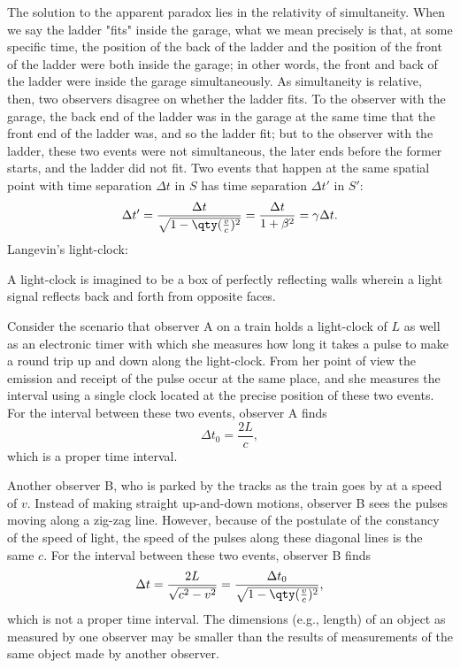 \documentclass[a4paper,12pt]{article}
\begin{document}
The solution to the apparent paradox lies in the relativity of simultaneity. When we say the ladder "fits" inside the garage, what we mean precisely is that, at some specific time, the position of the back of the ladder and the position of the front of the ladder were both inside the garage; in other words, the front and back of the ladder were inside the garage simultaneously. As simultaneity is relative, then, two observers disagree on whether the ladder fits. To the observer with the garage, the back end of the ladder was in the garage at the same time that the front end of the ladder was, and so the ladder fit; but to the observer with the ladder, these two events were not simultaneous, the later ends before the former starts, and the ladder did not fit.
Two events that happen at the same spatial point with time separation $\Delta t$ in $S$ has time separation $\Delta t'$ in $S'$:
\[\Delta t'=\frac{\Delta t}{\sqrt{1-\qty(\frac{v}{c})^2}}=\frac{\Delta t}{1+\beta^2}=\gamma\Delta t.\]
Langevin's light-clock: 

A light-clock is imagined to be a box of perfectly reflecting walls wherein a light signal reflects back and forth from opposite faces.

Consider the scenario that observer A on a train holds a light-clock of $L$ as well as an electronic timer with which she measures how long it takes a pulse to make a round trip up and down along the light-clock. From her point of view the emission and receipt of the pulse occur at the same place, and she measures the interval using a single clock located at the precise position of these two events. For the interval between these two events, observer A finds
\[\Delta t_0=\frac{2L}{c},\]
which is a proper time interval.

Another observer B, who is parked by the tracks as the train goes by at a speed of $v$⁠. Instead of making straight up-and-down motions, observer B sees the pulses moving along a zig-zag line. However, because of the postulate of the constancy of the speed of light, the speed of the pulses along these diagonal lines is the same $c$. For the interval between these two events, observer B finds
\[\Delta t=\frac{2L}{\sqrt{c^2-v^2}}=\frac{\Delta t_0}{\sqrt{1-\qty(\frac{v}{c})^2}},\]
which is not a proper time interval.
The dimensions (e.g., length) of an object as measured by one observer may be smaller than the results of measurements of the same object made by another observer.
\end{document}
